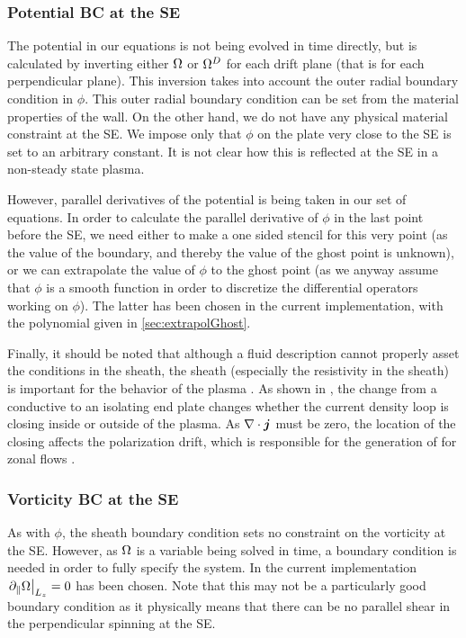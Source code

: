 \subsubsection{Potential BC at the SE}
%
The potential in our equations is not being evolved in time directly, but is calculated by inverting either $\Omega$ or $\Omega^D$ for each drift plane (that is for each perpendicular plane).
This inversion takes into account the outer radial boundary condition in $\phi$.
This outer radial boundary condition can be set from the material properties of the wall.
On the other hand, we do not have any physical material constraint at the SE.
We impose only that $\phi$ on the plate very close to the SE is set to an arbitrary constant.
It is not clear how this is reflected at the SE in a non-steady state plasma.

However, parallel derivatives of the potential is being taken in our set of equations.
In order to calculate the parallel derivative of $\phi$ in the last point before the SE, we need either to make a one sided stencil for this very point (as the value of the boundary, and thereby the value of the ghost point is unknown), or we can extrapolate the value of $\phi$ to the ghost point (as we anyway assume that $\phi$ is a smooth function in order to discretize the differential operators working on $\phi$).
The latter has been chosen in the current implementation, with the polynomial given in \cref{sec:extrapolGhost}.

Finally, it should be noted that although a fluid description cannot properly asset the conditions in the sheath, the sheath (especially the resistivity in the sheath) is important for the behavior of the plasma \cite{Oldenburger2012,Yamada2014}.
As shown in \cite{ChakrabortyThakur2013}, the change from a conductive to an isolating end plate changes whether the current density loop is closing inside or outside of the plasma. As $\nabla\cdot \boldsymbol{j}$ must be zero, the location of the closing affects the polarization drift, which is responsible for the generation of for  zonal flows \cite{Diamond1991}.

\subsubsection{Vorticity BC at the SE}
%
As with $\phi$, the sheath boundary condition sets no constraint on the vorticity at the SE.
However, as $\Omega$ is a variable being solved in time, a boundary condition is needed in order to fully specify the system.
In the current implementation $\left. \partial_\| \Omega \right|_{L_z} = 0$ has been chosen.
Note that this may not be a particularly good boundary condition as it physically means that there can be no parallel shear in the perpendicular spinning at the SE.

